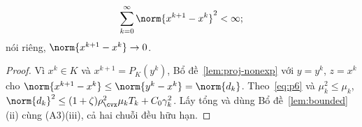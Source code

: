 \begin{proposition}\label{prop:regularity}
\[
\sum_{k=0}^{\infty}\norm{x^{k+1}-x^k}^{2}<\infty;
\]
nói riêng,
$\norm{x^{k+1}-x^k}\to0$.
\end{proposition}
\begin{proof}
Vì $x^k\in K$ và $x^{k+1}=P_K(y^k)$, Bổ đề~\ref{lem:proj-nonexp} với $y=y^k$, $z=x^k$
cho $\norm{x^{k+1}-x^k}\le\norm{y^k-x^k}=\norm{d_k}$. Theo~\eqref{eq:p6} và
$\mu_k^2\le\mu_k$, $\norm{d_k}^2\le(1+\zeta)\rho_{\cvx}^2\mu_k T_k+C_0\gamma_k^2$.
Lấy tổng và dùng Bổ đề~\ref{lem:bounded}(ii) cùng (A3)(iii), cả hai chuỗi đều hữu hạn.
\end{proof}

